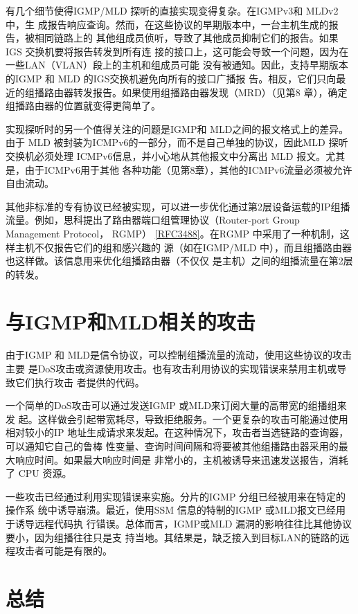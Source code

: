 有几个细节使得IGMP/MLD 探听的直接实现变得复杂。在IGMPv3和 MLDv2中，生
成报告响应查询。然而，在这些协议的早期版本中，一台主机生成的报告，被相同链路上的
其他组成员侦听，导致了其他成员抑制它们的报告。如果IGS 交换机要将报告转发到所有连
接的接口上，这可能会导致一个问题，因为在一些LAN（VLAN）段上的主机和组成员可能
没有被通知。因此，支持早期版本的IGMP 和 MLD 的IGS交换机避免向所有的接口广播报
告。相反，它们只向最近的组播路由器转发报告。如果使用组播路由器发现（MRD）（见第8
章），确定组播路由器的位置就变得更简单了。

实现探听时的另一个值得关注的问题是IGMP和 MLD之间的报文格式上的差异。由于
MLD 被封装为ICMPv6的一部分，而不是自己单独的协议，因此MLD 探听交换机必须处理
ICMPv6信息，并小心地从其他报文中分离出 MLD 报文。尤其是，由于ICMPv6用于其他
各种功能（见第8章），其他的ICMPv6流量必须被允许自由流动。

其他非标准的专有协议已经被实现，可以进一步优化通过第2层设备运载的IP组播
流量。例如，思科提出了路由器端口组管理协议（Router-port Group Management Protocol，
RGMP） \href{https://www.rfc-editor.org/rfc/rfc3488}{[RFC3488]}。在RGMP
中采用了一种机制，这样主机不仅报告它们的组和感兴趣的
源（如在IGMP/MLD 中），而且组播路由器也这样做。该信息用来优化组播路由器（不仅仅
是主机）之间的组播流量在第2层的转发。

\section{与IGMP和MLD相关的攻击}

由于IGMP 和 MLD是信令协议，可以控制组播流量的流动，使用这些协议的攻击主要
是DoS攻击或资源使用攻击。也有攻击利用协议的实现错误来禁用主机或导致它们执行攻击
者提供的代码。

一个简单的DoS攻击可以通过发送IGMP 或MLD来订阅大量的高带宽的组播组来发
起。这样做会引起带宽耗尽，导致拒绝服务。一个更复杂的攻击可能通过使用相对较小的IP
地址生成请求来发起。在这种情况下，攻击者当选链路的查询器，可以通知它自己的鲁棒
性变量、查询时间间隔和将要被其他组播路由器采用的最大响应时间。如果最大响应时间是
非常小的，主机被诱导来迅速发送报告，消耗了 CPU 资源。

一些攻击已经通过利用实现错误来实施。分片的IGMP 分组已经被用来在特定的操作系
统中诱导崩溃。最近，使用SSM 信息的特制的IGMP 或MLD报文已经用于诱导远程代码执
行错误。总体而言，IGMP或MLD 漏洞的影响往往比其他协议要小，因为组播往往只是支
持当地。其结果是，缺乏接入到目标LAN的链路的远程攻击者可能是有限的。

\section{总结}

